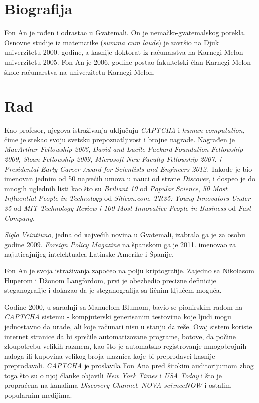 \documentclass[titlepage, 12pt]{article}
\begin{document}
\section{Biografija}
Fon An je rođen i odrastao u Gvatemali. On je nemačko-gvatemalskog porekla. 
Osnovne studije iz matematike (\textit{summa cum laude}) je završio na Djuk univerzitetu 2000. godine, a kasnije doktorat iz računarstva na Karnegi Melon univerzitetu 2005.
Fon An je 2006. godine postao fakultetski član Karnegi Melon škole računarstva na univerzitetu Karnegi Melon.

\section{Rad}
Kao profesor, njegova istraživanja uključuju \textit{CAPTCHA} i \textit{human computation}, čime je stekao svoju svetsku prepoznatljivost i brojne nagrade. Nagrađen je \textit{MacArthur Fellowship 2006}, \textit{David and Lucile Packard Foundation Fellowship 2009, Sloan Fellowship 2009, Microsoft New Faculty Fellowship 2007. i Presidental Early Career Award for Scientists and Engineers 2012}. Takođe je bio imenovan jednim od 50 najvećih umova u nauci od strane \textit{Discover}, i dospeo je do mnogih uglednih listi kao što su \textit{Briliant 10} od \textit{Popular Science}, \textit{50 Most Influential People in Technology} od \textit{Silicon.com}, \textit{TR35: Young Innovators Under 35} od \textit{MIT Technology Review i 100 Most Innovative People in Business} od \textit{Fast Company}. 

\textit{Siglo Veintiuno}, jedna od najvećih novina u Gvatemali, izabrala ga je za osobu godine 2009. \textit{Foreign Policy Magazine} na španskom ga je 2011. imenovao za najuticajnijeg intelektualca Latinske Amerike i Španije. 

Fon An je svoja istraživanja započeo na polju kriptografije. Zajedno sa Nikolasom Huperom i Džonom Langfordom, prvi je obezbedio precizne definicije steganografije i dokazao da je steganografija sa ličnim ključem moguća.

Godine 2000, u saradnji sa Manuelom Blumom, bavio se pionirskim radom na \textit{CAPTCHA} sistemu - kompjuterski generisanim testovima koje ljudi mogu jednostavno da urade, ali koje računari nisu u stanju da reše. Ovaj sistem koriste internet stranice da bi sprečile automatizovane programe, botove, da počine zloupotrebu velikih razmera, kao što je automatsko registrovanje mnogobrojnih naloga ili kupovina velikog broja ulaznica koje bi preprodavci kasnije preprodavali. \textit{CAPTCHA} je proslavila Fon Ana pred širokim auditorijumom zbog toga što su o njoj članke objavili \textit{New York Times} i \textit{USA Today} i što je propraćena na kanalima \textit{Discovery Channel}, \textit{NOVA scienceNOW} i ostalim popularnim medijima.
\end{document}
